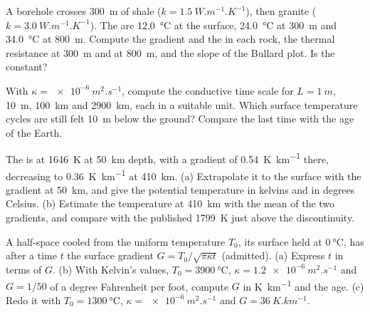 \begin{exercise}[$\star\star$]\label{exo:b1:heat-budget:6}
A borehole crosses \qty{300}{m} of shale ($k = \qty{1.5}{W.m^{-1}.K^{-1}}$), then
granite ($k = \qty{3.0}{W.m^{-1}.K^{-1}}$). The  are
\qty{12.0}{\degreeCelsius} at the surface, \qty{24.0}{\degreeCelsius} at
\qty{300}{m} and \qty{34.0}{\degreeCelsius} at \qty{800}{m}. Compute the
gradient and the  in each rock, the thermal resistance at \qty{300}{m}
and at \qty{800}{m}, and the slope of the Bullard plot. Is the 
constant?
\end{exercise}

\begin{exercise}[$\star\star$]\label{exo:b1:heat-budget:7}
With $\kappa = \qty{e-6}{m^2.s^{-1}}$, compute the conductive time scale for
$L = \qty{1}{m}$, \qty{10}{m}, \qty{100}{km} and \qty{2900}{km}, each in a
suitable unit. Which surface temperature cycles are still felt \qty{10}{m} below
the ground? Compare the last time with the age of the Earth.
\end{exercise}

\begin{exercise}[$\star\star$]\label{exo:b1:heat-budget:8}
The  is at \qty{1646}{K} at \qty{50}{km} depth, with a gradient of
\qty{0.54}{K.km^{-1}} there, decreasing to \qty{0.36}{K.km^{-1}} at \qty{410}{km}.
(a) Extrapolate it to the surface with the gradient at \qty{50}{km}, and give the
potential temperature in kelvins and in degrees Celsius. (b) Estimate the
temperature at \qty{410}{km} with the mean of the two gradients, and compare
with the published \qty{1799}{K} just above the discontinuity.
\end{exercise}

\begin{exercise}[$\star\star$]\label{exo:b1:heat-budget:9}
A half-space cooled from the uniform temperature $T_0$, its surface held at
$\qty{0}{\degreeCelsius}$, has after a time $t$ the surface gradient $G =
T_0/\sqrt{\pi\kappa t}$ (admitted). (a) Express $t$ in terms of $G$. (b) With
Kelvin's values, $T_0 = \qty{3900}{\degreeCelsius}$, $\kappa =
\qty{1.2e-6}{m^2.s^{-1}}$ and $G = 1/50$ of a degree Fahrenheit per foot,
compute $G$ in \unit{K.km^{-1}} and the age. (c) Redo it with $T_0 =
\qty{1300}{\degreeCelsius}$, $\kappa = \qty{e-6}{m^2.s^{-1}}$ and $G =
\qty{36}{K.km^{-1}}$.
\end{exercise}

